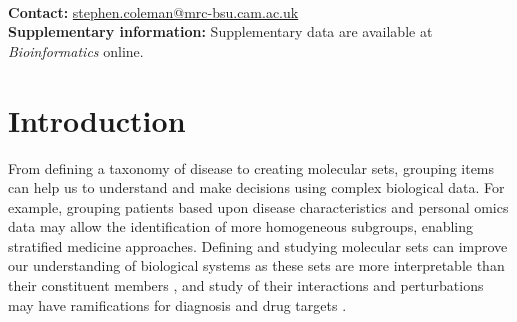\documentclass{bioinfo}
\begin{document}
{%
\\
\textbf{Contact:} \href{stephen.coleman@mrc-bsu.cam.ac.uk}{stephen.coleman@mrc-bsu.cam.ac.uk}\\
\textbf{Supplementary information:} Supplementary data are available at \textit{Bioinformatics} online.}

\maketitle

\section{Introduction}

From defining a taxonomy of disease to creating molecular sets, grouping items can help us to understand and make decisions using complex biological data. For example, grouping patients based upon disease characteristics and personal omics data may allow the identification of more homogeneous subgroups, enabling stratified medicine approaches. Defining and studying molecular sets can improve our understanding of biological systems as these sets are more interpretable than their constituent members \citep{hejblum2015time}, and study of their interactions and perturbations may have ramifications for diagnosis and drug targets \citep{bai2013strategic, emmert2014gene}. 

\end{document}
